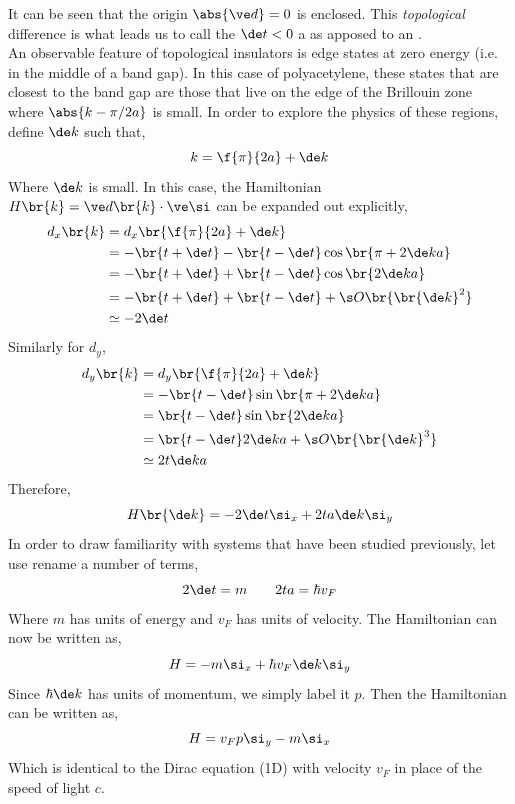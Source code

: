 \documentclass{article}
\begin{document}
It can be seen that the origin $\abs{\ve d} = 0$ is enclosed. This \textit{topological} difference is what leads us to call the $\de t < 0$ a  as apposed to an .\\

An observable feature of topological insulators is edge states at zero energy (i.e. in the middle of a band gap). In this case of polyacetylene, these states that are closest to the band gap are those that live on the edge of the Brillouin zone where $\abs{k - \pi / 2a}$ is small. In order to explore the physics of these regions, define $\de k$ such that,
\[ k = \f{\pi}{2a} + \de k \]
Where $\de k$ is small. In this case, the Hamiltonian $H\br{k} = \ve d \br{k} \cdot \ve \si$ can be expanded out explicitly,
\begin{align*}
    d_x\br{k}
    &= d_x\br{\f{\pi}{2a} + \de k} \\
    &= - \br{t + \de t} - \br{t - \de t} \cos \br{\pi + 2 \de k a} \\
    &= - \br{t + \de t} + \br{t - \de t} \cos \br{2 \de k a} \\
    &= - \br{t + \de t} + \br{t - \de t} + \s O \br{\br{\de k}^2} \\
    &\simeq - 2 \de t
\end{align*}
Similarly for $d_y$,
\begin{align*}
    d_y\br{k}
    &= d_y\br{\f{\pi}{2a} + \de k} \\
    &= - \br{t - \de t} \sin \br{\pi + 2 \de k a} \\
    &= \br{t - \de t} \sin \br{2 \de k a} \\
    &= \br{t - \de t} 2 \de k a + \s O \br{\br{\de k}^3} \\
    &\simeq 2 t \de k a
\end{align*}
Therefore,
\[ H\br{\de k} = - 2 \de t \si_x + 2 t a \de k \si_y \]
In order to draw familiarity with systems that have been studied previously, let use rename a number of terms,
\[ 2 \de t = m \qquad 2 t a = \hbar v_F\]
Where $m$ has units of energy and $v_F$ has units of velocity. The Hamiltonian can now be written as,
\[ H = - m \si_x + \hbar v_F \de k \si_y \]
Since $\hbar \de k$ has units of momentum, we simply label it $p$. Then the Hamiltonian can be written as,
\[ H = v_F p \si_y - m \si_x \]
Which is identical to the Dirac equation (1D) with velocity $v_F$ in place of the speed of light $c$.
\end{document}
